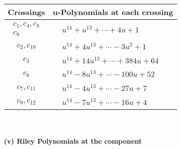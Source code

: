 \documentclass[1p]{elsarticle_modified}
\theoremstyle{definition}
\begin{document}
\begin{tabular}{m{50pt}|m{274pt}}
Crossings & \hspace{64pt}u-Polynomials at each crossing \\
\hline $$\begin{aligned}c_{1},c_{4},c_{5}\\c_{8}\end{aligned}$$&$\begin{aligned}
&u^{14}+u^{13}+\cdots+4 u+1
\end{aligned}$\\
\hline $$\begin{aligned}c_{2},c_{10}\end{aligned}$$&$\begin{aligned}
&u^{14}+4 u^{13}+\cdots-3 u^2+1
\end{aligned}$\\
\hline $$\begin{aligned}c_{3}\end{aligned}$$&$\begin{aligned}
&u^{14}+14 u^{13}+\cdots+384 u+64
\end{aligned}$\\
\hline $$\begin{aligned}c_{6}\end{aligned}$$&$\begin{aligned}
&u^{14}-8 u^{13}+\cdots-100 u+52
\end{aligned}$\\
\hline $$\begin{aligned}c_{7},c_{11}\end{aligned}$$&$\begin{aligned}
&u^{14}-4 u^{13}+\cdots-27 u+7
\end{aligned}$\\
\hline $$\begin{aligned}c_{9},c_{12}\end{aligned}$$&$\begin{aligned}
&u^{14}-7 u^{13}+\cdots-16 u+4
\end{aligned}$\\
\hline
\end{tabular}\\~\\
\newpage\renewcommand{\arraystretch}{1}
\flushleft \textbf{(v) Riley Polynomials at the component}\newline \\
\end{document}
